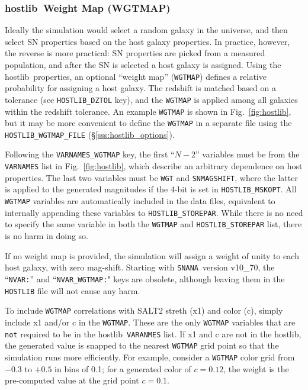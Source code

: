 \documentclass[12pt]{article}
\newcommand{\snana}{{\tt SNANA}}
\newcommand{\hostlib}{{\sc hostlib}}
\begin{document}
{%


\subsubsection{\hostlib\ Weight Map (WGTMAP)}
\label{sss:hostlib_wgtmap}

Ideally the simulation would select a random galaxy in the universe,
and then select SN properties based on the host galaxy properties.
In practice, however, the reverse is more practical: SN properties 
are picked from a measured population, and after the SN is selected
a host galaxy is assigned.
Using the \hostlib\ properties, an optional ``weight map'' ({\tt WGTMAP}) 
defines a relative probability for assigning a host galaxy. 
The redshift is matched based on a tolerance
(see {\tt HOSTLIB\_DZTOL} key), and the {\tt WGTMAP} is applied among
all galaxies within the redshift tolerance.
An example {\tt WGTMAP} is shown in Fig.~\ref{fig:hostlib}, but it may be
more convenient to define the {\tt WGTMAP} in a separate file using the
{\tt HOSTLIB\_WGTMAP\_FILE} (\S\ref{sss:hostlib_options}).

Following the {\tt VARNAMES\_WGTMAP} key, the first ``$N-2$'' 
variables must be from the {\tt VARNAMES} list in Fig.~\ref{fig:hostlib},
which describe an arbitrary dependence on host properties.
The last two variables must be {\tt WGT} and {\tt SNMAGSHIFT},
where the latter is applied to the generated magnitudes if the
4-bit is set in {\tt HOSTLIB\_MSKOPT}.
All {\tt WGTMAP} variables are automatically included in the
data files, equivalent to internally appending these variables to 
{\tt HOSTLIB\_STOREPAR}. While there is no need to specify the
same variable in both the {\tt WGTMAP} and {\tt HOSTLIB\_STOREPAR} list,
there is no harm in doing so.

If no weight map is provided, the simulation will assign
a weight of unity to each host galaxy, with zero mag-shift.
Starting with \snana\ version v10\_70, the ``{\tt NVAR:}''
and ``{\tt NVAR\_WGTMAP:}" keys are obsolete, although leaving
them in the {\tt HOSTLIB} file will not cause any harm.

To include {\tt WGTMAP} correlations with SALT2 streth (x1) and color (c),
simply include x1 and/or c in the {\tt WGTMAP}. These are the only
{\tt WGTMAP} variables that are {\tt not} required to be in the
\hostlib\ {\tt VARANMES} list. If x1 and c are not in the \hostlib,
the generated value is snapped to the nearest {\tt WGTMAP} grid point
so that the simulation runs more efficiently. For example,
consider a {\tt WGTMAP} color grid from $-0.3$ to $+0.5$ in bins of 0.1;
for a generated color of $c=0.12$, the weight is the pre-computed value
at the grid point $c=0.1$. 

}
\end{document}
